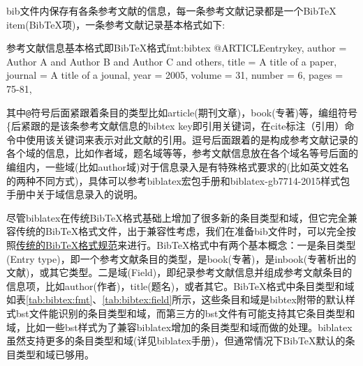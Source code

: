 \documentclass[twoside]{article} %
\begin{document}
bib文件内保存有各条参考文献的信息，每一条参考文献记录都是一个BibTeX item(BibTeX项)，一条参考文献记录基本格式如下:

\begin{codetex}{参考文献信息基本格式即BibTeX格式}{fmt:bibtex}
@ARTICLE{entrykey,
  author =       {Author A and Author B and Author C and others},
  title =        {A title of a paper},
  journal =      {A title of a jounal},
  year =         {2005},
  volume =       {31},
  number =       {6},
  pages =        {75-81},
}
\end{codetex}

其中\verb|@|符号后面紧跟着条目的类型比如article(期刊文章)，book(专著)等，编组符号\{后紧跟的是该条参考文献信息的bibtex key即引用关键词，在cite标注（引用）命令中使用该关键词来表示对此文献的引用。逗号后面跟着的是构成参考文献记录的各个域的信息，比如作者域，题名域等等，参考文献信息放在各个域名等号后面的编组内，一些域(比如author域)对于信息录入是有特殊格式要求的(比如英文姓名的两种不同方式)，具体可以参考biblatex宏包手册和biblatex-gb7714-2015样式包手册\cite{胡振震2016}中关于域信息录入的说明。

尽管biblatex在传统BibTeX格式基础上增加了很多新的条目类型和域，但它完全兼容传统的BibTeX格式文件，出于兼容性考虑，我们在准备bib文件时，可以完全按照\href{https://en.wikipedia.org/wiki/BibTeX}{传统的BibTeX格式规范}来进行。BibTeX格式中有两个基本概念：一是条目类型(Entry type)，即一个参考文献条目的类型，是book(专著)，是inbook(专著析出的文献)，或其它类型。二是域(Field)，即纪录参考文献信息并组成参考文献条目的信息项，比如author(作者)，title(题名)，或者其它。BibTeX格式中条目类型和域
如表\ref{tab:bibtex:fmt}、\ref{tab:bibtex:field}所示，这些条目和域是bibtex附带的默认样式bst文件能识别的条目类型和域，而第三方的bst文件有可能支持其它条目类型和域，比如一些bst样式为了兼容biblatex增加的条目类型和域而做的处理。biblatex 虽然支持更多的条目类型和域(详见biblatex手册)，但通常情况下BibTeX默认的条目类型和域已够用。
\end{document}
